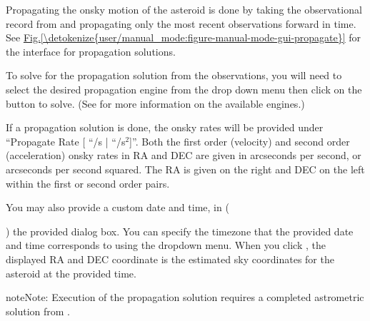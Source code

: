 \documentclass[letterpaper,11pt,english]{sphinxmanual}
\begin{document}
\sphinxAtStartPar
Propagating the on\sphinxhyphen{}sky motion of the asteroid is done by taking the
observational record from
{\hyperref[\detokenize{user/manual_mode:user-manual-mode-procedure-asteroid-observation-record}]{}} and propagating
only the most recent observations forward in time. See
\hyperref[\detokenize{user/manual_mode:figure-manual-mode-gui-propagate}]{Fig.\@ \ref{\detokenize{user/manual_mode:figure-manual-mode-gui-propagate}}} for the interface for propagation solutions.

\sphinxAtStartPar
To solve for the propagation solution from the observations, you will need to
select the desired propagation engine from the drop down menu then click on the
 button to solve.
(See {\hyperref[\detokenize{technical/architecture/services_engines:technical-architecture-services-engines}]{}} for more information on
the available engines.)

\sphinxAtStartPar
If a propagation solution is done, the on\sphinxhyphen{}sky rates will be provided under
“Propagate Rate {[} “/s | “/s$^{\text{2}}${]}”. Both the first order (velocity) and
second order (acceleration) on\sphinxhyphen{}sky rates in RA and DEC are given in arcseconds
per second, or arcseconds per second squared. The RA is given on the right and
DEC on the left within the first or second order pairs.

\sphinxAtStartPar
You may also provide a custom date and time, in
(%
\begin{footnote}[7]\sphinxAtStartFootnote
{}
%
\end{footnote}) the
provided dialog box. You can specify the timezone that the provided date and
time corresponds to using the dropdown menu. When you click ,
the displayed RA and DEC coordinate is the estimated sky coordinates for the
asteroid at the provided time.

\begin{sphinxadmonition}{note}{Note:}
\sphinxAtStartPar
Execution of the propagation solution requires a completed astrometric
solution from
{\hyperref[\detokenize{user/manual_mode:user-manual-mode-procedure-find-asteroid-location-compute-astrometric-solution}]{}}.
\end{sphinxadmonition}
\end{document}
